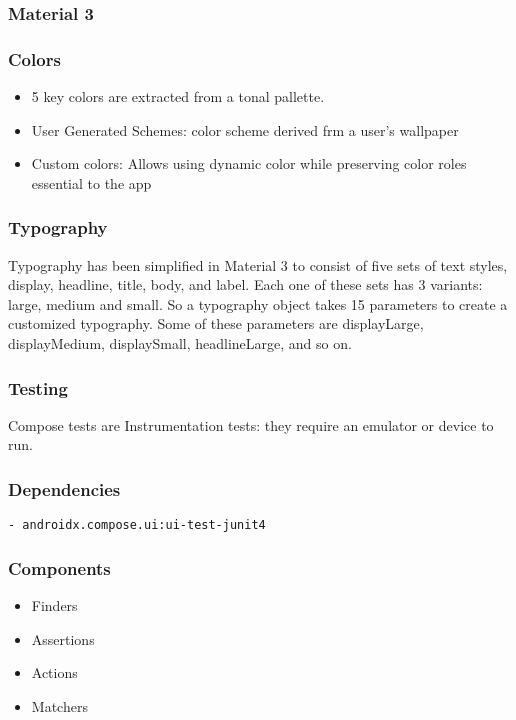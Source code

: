 \documentclass{article}
\begin{document}
\subsubsection{Material 3}


\subsubsection*{Colors}
\begin{itemize}
  \item 5 key colors are extracted from a tonal pallette. 
  \item User Generated Schemes: color scheme derived frm a user's wallpaper
  \item Custom colors: Allows using dynamic color while preserving color roles essential to the app
\end{itemize}
  
\subsubsection*{Typography}
Typography has been simplified in Material 3 to consist of five sets of text styles, display, headline, title, body, and label. 
Each one of these sets has 3 variants: large, medium and small. So a typography object takes 15 parameters to create a customized typography. Some of these parameters are displayLarge, displayMedium, displaySmall, headlineLarge, and so on. 

\subsubsection{Testing}
Compose tests are Instrumentation tests: they require an emulator or device to run. 
\subsubsection{Dependencies}
\begin{verbatim}
- androidx.compose.ui:ui-test-junit4
\end{verbatim}

\subsubsection{Components}
\begin{itemize}
\item Finders
\item Assertions
\item Actions
\item Matchers
\end{itemize}
\end{document}
